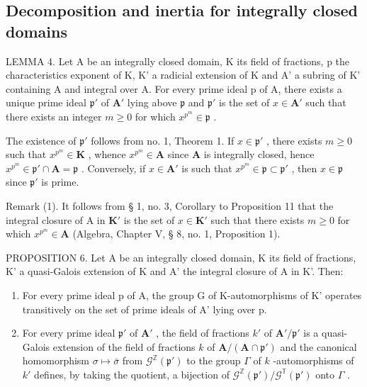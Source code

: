 \subsection{Decomposition and inertia for integrally closed domains}

LEMMA 4. Let A be an integrally closed domain, K its field of fractions, p the characteristics exponent of K, K' a radicial extension of K and A' a subring of K' containing A and integral over A. For every prime ideal p of A, there exists a unique prime ideal \(\mathfrak{p}'\) of \(\mathbf{A}'\) lying above \(\mathfrak{p}\) and \(\mathfrak{p}'\) is the set of \(x \in \mathbf{A}'\) such that there exists an integer \(m \geqslant 0\) for which \(x^{p^m} \in \mathfrak{p}\) .

The existence of \(\mathfrak{p}'\) follows from no. 1, Theorem 1. If \(x \in \mathfrak{p}'\) , there exists \(m \geqslant 0\) such that \(x^{p^m} \in \mathbf{K}\) , whence \(x^{p^m} \in \mathbf{A}\) since \(\mathbf{A}\) is integrally closed, hence \(x^{p^m} \in \mathfrak{p}' \cap \mathbf{A} = \mathfrak{p}\) . Conversely, if \(x \in \mathbf{A}'\) is such that \(x^{p^m} \in \mathfrak{p} \subset \mathfrak{p}'\) , then \(x \in \mathfrak{p}\) since \(\mathfrak{p}'\) is prime.

Remark (1). It follows from § 1, no. 3, Corollary to Proposition 11 that the integral closure of A in \(\mathbf{K}'\) is the set of \(x \in \mathbf{K}'\) such that there exists \(m \geqslant 0\) for which \(x^{p^m} \in \mathbf{A}\) (Algebra, Chapter V, § 8, no. 1, Proposition 1).

PROPOSITION 6. Let A be an integrally closed domain, K its field of fractions, K' a quasi-Galois extension of K and A' the integral closure of A in K'. Then:

\begin{enumerate}
\def\labelenumi{(\roman{enumi})}
\item
  For every prime ideal p of A, the group G of K-automorphisms of K' operates transitively on the set of prime ideals of A' lying over p.
\item
  For every prime ideal \(\mathfrak{p}'\) of \(\mathbf{A}'\) , the field of fractions \(k'\) of \(\mathbf{A}' / \mathfrak{p}'\) is a quasi-Galois extension of the field of fractions \(k\) of \(\mathbf{A} / (\mathbf{A} \cap \mathfrak{p}')\) and the canonical homomorphism \(\sigma \mapsto \bar{\sigma}\) from \(\mathcal{G}^{\mathbb{Z}}(\mathfrak{p}')\) to the group \(\Gamma\) of \(k\) -automorphisms of \(k'\) defines, by taking the quotient, a bijection of \(\mathcal{G}^{\mathbb{Z}}(\mathfrak{p}') / \mathcal{G}^{\mathbb{T}}(\mathfrak{p}')\) onto \(\Gamma\) .
\end{enumerate}

